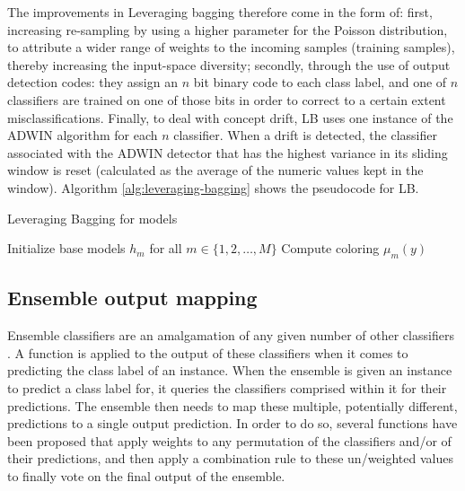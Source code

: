 The improvements in Leveraging bagging \cite{bifet2010leveraging} therefore come in the form of: first, increasing re-sampling by using a higher parameter for the Poisson distribution, to attribute a wider range of weights to the incoming samples (training samples), thereby increasing the input-space diversity; secondly, through the use of output detection codes: they assign an $n$ bit binary code to each class label, and one of $n$ classifiers are trained on one of those bits in order to correct to a certain extent misclassifications. Finally, to deal with concept drift, LB uses one instance of the ADWIN algorithm for each $n$ classifier. When a drift is detected, the classifier associated with the ADWIN detector that has the highest variance in its sliding window is reset (calculated as the average of the numeric values kept in the window). Algorithm \ref{alg:leveraging-bagging} shows the pseudocode for LB.

\begin{algorithm}
\caption{Leveraging Bagging for  models\label{alg:leveraging-bagging} \cite{bifet2010leveraging}}
Initialize base models $h_{m}$ for all $m \in \{1,2, \ldots, M\}$
Compute coloring $\mu_m(y)$
\end{algorithm}


\subsection{Ensemble output mapping\label{section:voting_ensemble}}
Ensemble classifiers are an amalgamation of any given number of other classifiers \cite{KRAWCZYK2017132,opitz1999popular,polikar2006ensemble,rokach2010ensemble}. A function is applied to the output of these classifiers when it comes to predicting the class label of an instance. When the ensemble is given an instance to predict a class label for, it queries the classifiers comprised within it for their predictions. The ensemble then needs to map these multiple, potentially different, predictions to a single output prediction. In order to do so, several functions have been proposed that apply weights to any permutation of the classifiers and/or of their predictions, and then apply a combination rule to these un/weighted values to finally vote on the final output of the ensemble.


